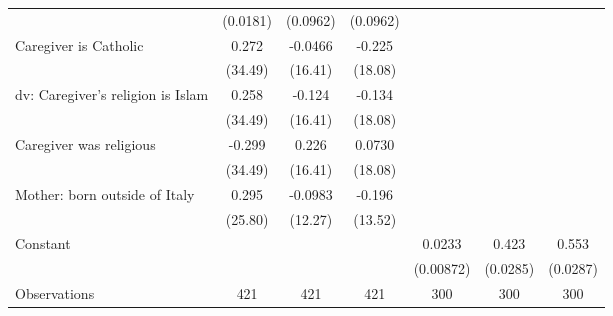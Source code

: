 {\begin{tabular}{l*{6}{c}}
                    &    (0.0181)         &    (0.0962)         &    (0.0962)         &                     &                     &                     \\
\addlinespace
Caregiver is Catholic&       0.272         &     -0.0466         &      -0.225         &                     &                     &                     \\
                    &     (34.49)         &     (16.41)         &     (18.08)         &                     &                     &                     \\
\addlinespace
dv: Caregiver's religion is Islam&       0.258         &      -0.124         &      -0.134         &                     &                     &                     \\
                    &     (34.49)         &     (16.41)         &     (18.08)         &                     &                     &                     \\
\addlinespace
Caregiver was religious&      -0.299         &       0.226         &      0.0730         &                     &                     &                     \\
                    &     (34.49)         &     (16.41)         &     (18.08)         &                     &                     &                     \\
\addlinespace
Mother: born outside of Italy&       0.295         &     -0.0983         &      -0.196         &                     &                     &                     \\
                    &     (25.80)         &     (12.27)         &     (13.52)         &                     &                     &                     \\
\addlinespace
Constant            &                     &                     &                     &      0.0233\sym{**} &       0.423\sym{***}&       0.553\sym{***}\\
                    &                     &                     &                     &   (0.00872)         &    (0.0285)         &    (0.0287)         \\
\midrule
Observations        &         421         &         421         &         421         &         300         &         300         &         300         \\
\bottomrule
\end{tabular}
}
